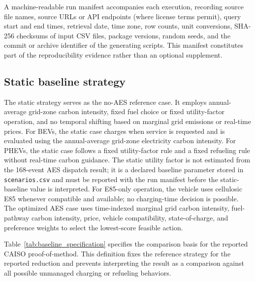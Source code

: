 \documentclass[cleantechnol,article,submit,pdftex,moreauthors]{Definitions/mdpi}
\begin{document}
A machine-readable run manifest accompanies each execution, recording source file names, source URLs or API endpoints (where license terms permit), query start and end times, retrieval date, time zone, row counts, unit conversions, SHA-256 checksums of input CSV files, package versions, random seeds, and the commit or archive identifier of the generating scripts. This manifest constitutes part of the reproducibility evidence rather than an optional supplement.


\subsection{Static baseline strategy}
\label{subsec:static_baseline}

The static strategy serves as the no-AES reference case. It employs annual-average grid-zone carbon intensity, fixed fuel choice or fixed utility-factor operation, and no temporal shifting based on marginal grid emissions or real-time prices. For BEVs, the static case charges when service is requested and is evaluated using the annual-average grid-zone electricity carbon intensity. For PHEVs, the static case follows a fixed utility-factor rule and a fixed refueling rule without real-time carbon guidance. The static utility factor is not estimated from the 168-event AES dispatch result; it is a declared baseline parameter stored in \texttt{scenarios.csv} and must be reported with the run manifest before the static-baseline value is interpreted. For E85-only operation, the vehicle uses cellulosic E85 whenever compatible and available; no charging-time decision is possible. The optimized AES case uses time-indexed marginal grid carbon intensity, fuel-pathway carbon intensity, price, vehicle compatibility, state-of-charge, and preference weights to select the lowest-score feasible action.

Table~\ref{tab:baseline_specification} specifies the comparison basis for the reported CAISO proof-of-method. This definition fixes the reference strategy for the reported reduction and prevents interpreting the result as a comparison against all possible unmanaged charging or refueling behaviors.
\end{document}
